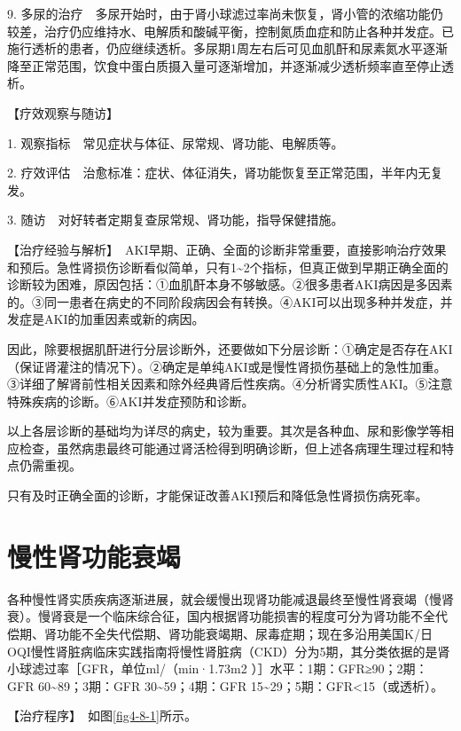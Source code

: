 9.
多尿的治疗　多尿开始时，由于肾小球滤过率尚未恢复，肾小管的浓缩功能仍较差，治疗仍应维持水、电解质和酸碱平衡，控制氮质血症和防止各种并发症。已施行透析的患者，仍应继续透析。多尿期1周左右后可见血肌酐和尿素氮水平逐渐降至正常范围，饮食中蛋白质摄入量可逐渐增加，并逐渐减少透析频率直至停止透析。

【疗效观察与随访】

1. 观察指标　常见症状与体征、尿常规、肾功能、电解质等。

2.
疗效评估　治愈标准：症状、体征消失，肾功能恢复至正常范围，半年内无复发。

3. 随访　对好转者定期复查尿常规、肾功能，指导保健措施。

【治疗经验与解析】　AKI早期、正确、全面的诊断非常重要，直接影响治疗效果和预后。急性肾损伤诊断看似简单，只有1\textasciitilde{}2个指标，但真正做到早期正确全面的诊断较为困难，原因包括：①血肌酐本身不够敏感。②很多患者AKI病因是多因素的。③同一患者在病史的不同阶段病因会有转换。④AKI可以出现多种并发症，并发症是AKI的加重因素或新的病因。

因此，除要根据肌酐进行分层诊断外，还要做如下分层诊断：①确定是否存在AKI（保证肾灌注的情况下）。②确定是单纯AKI或是慢性肾损伤基础上的急性加重。③详细了解肾前性相关因素和除外经典肾后性疾病。④分析肾实质性AKI。⑤注意特殊疾病的诊断。⑥AKI并发症预防和诊断。

以上各层诊断的基础均为详尽的病史，较为重要。其次是各种血、尿和影像学等相应检查，虽然病患最终可能通过肾活检得到明确诊断，但上述各病理生理过程和特点仍需重视。

只有及时正确全面的诊断，才能保证改善AKI预后和降低急性肾损伤病死率。

\section{慢性肾功能衰竭}

各种慢性肾实质疾病逐渐进展，就会缓慢出现肾功能减退最终至慢性肾衰竭（慢肾衰）。慢肾衰是一个临床综合征，国内根据肾功能损害的程度可分为肾功能不全代偿期、肾功能不全失代偿期、肾功能衰竭期、尿毒症期；现在多沿用美国K/日OQI慢性肾脏病临床实践指南将慢性肾脏病（CKD）分为5期，其分类依据的是肾小球滤过率［GFR，单位ml/（min·1.73m{2}
）］水平：1期：GFR≥90；2期：GFR 60\textasciitilde{}89；3期：GFR
30\textasciitilde{}59；4期：GFR
15\textasciitilde{}29；5期：GFR\textless{}15（或透析）。

【治疗程序】　如图\ref{fig4-8-1}所示。

